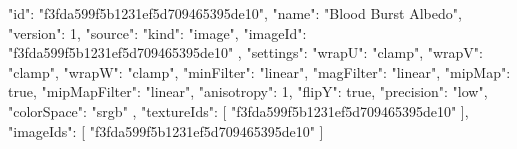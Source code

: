 {
  "id": "f3fda599f5b1231ef5d709465395de10",
  "name": "Blood Burst Albedo",
  "version": 1,
  "source": {
    "kind": "image",
    "imageId": "f3fda599f5b1231ef5d709465395de10"
  },
  "settings": {
    "wrapU": "clamp",
    "wrapV": "clamp",
    "wrapW": "clamp",
    "minFilter": "linear",
    "magFilter": "linear",
    "mipMap": true,
    "mipMapFilter": "linear",
    "anisotropy": 1,
    "flipY": true,
    "precision": "low",
    "colorSpace": "srgb"
  },
  "textureIds": [
    "f3fda599f5b1231ef5d709465395de10"
  ],
  "imageIds": [
    "f3fda599f5b1231ef5d709465395de10"
  ]
}
